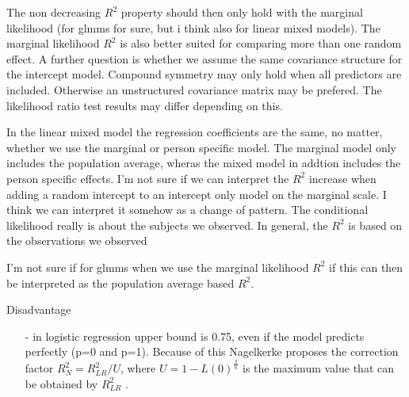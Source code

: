 \documentclass[11pt, a4paper]{article}\usepackage[]{graphicx}\usepackage[]{color}
\begin{document}
\begin{enumerate}
\begin {enumerate}
The non decreasing $R^2$ property should then only hold with the marginal likelihood (for glmms for sure, but i think also for linear mixed models). The marginal likelihood $R^2$ is also better suited for comparing more than one random effect. A further question is whether we assume the same covariance structure for the intercept model. Compound symmetry may only hold when all predictors are included. Otherwise an unstructured covariance matrix may be prefered. The likelihood ratio test results may differ depending on this.

In the linear mixed model the regression coefficients are the same, no matter, whether we use the marginal or person specific model. The marginal model only includes the population average, wheras the mixed model in addtion includes the person specific effects. 
I'm not sure if we can interpret the $R^2$ increase when adding a random intercept to an intercept only model on the marginal scale. I think we can interpret it somehow as a change of pattern. The conditional likelihood really is about the subjects we observed. In general, the $R^2$ is based on the observations we observed
 
I'm not sure if for glmms when we use the marginal likelihood $R^2$ if this can then be interpreted as the population average based $R^2$.
\end {enumerate}

Disadvantage

\begin {enumerate}
 \item[-] in logistic regression upper bound is 0.75, even if the model predicts perfectly (p=0 and p=1). Because of this Nagelkerke proposes the correction factor $ R^2_{N} = R^2_{LR}/U $, where $ U = 1 - L(0)^{\frac{2}{n}} $ is the maximum value that can be obtained by $ R^2_{LR} $ .

\end {enumerate}

\end{enumerate}
\end{document}
